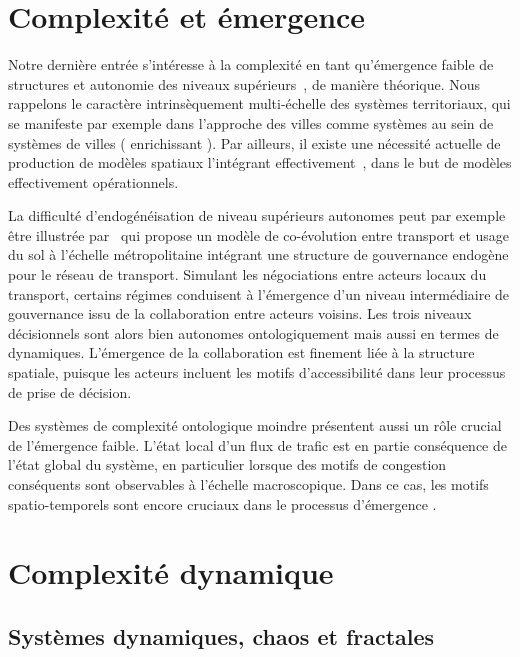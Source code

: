 \documentclass[11pt]{article}
\begin{document}
\section{Complexité et émergence}



Notre dernière entrée s'intéresse à la complexité en tant qu'émergence faible de structures et autonomie des niveaux supérieurs~\citep{bedau2002downward}, de manière théorique. Nous rappelons le caractère intrinsèquement multi-échelle des systèmes territoriaux, qui se manifeste par exemple dans l'approche des villes comme systèmes au sein de systèmes de villes (\cite{pumain1997pour} enrichissant \cite{berry1964cities}). Par ailleurs, il existe une nécessité actuelle de production de modèles spatiaux l'intégrant effectivement~\citep{rozenblat2018conclusion}, dans le but de modèles effectivement opérationnels.

La difficulté d'endogénéisation de niveau supérieurs autonomes peut par exemple être illustrée par~\cite{lenechet:halshs-01272236} qui propose un modèle de co-évolution entre transport et usage du sol à l'échelle métropolitaine intégrant une structure de gouvernance endogène pour le réseau de transport. Simulant les négociations entre acteurs locaux du transport, certains régimes conduisent à l'émergence d'un niveau intermédiaire de gouvernance issu de la collaboration entre acteurs voisins. Les trois niveaux décisionnels sont alors bien autonomes ontologiquement mais aussi en termes de dynamiques. L'émergence de la collaboration est finement liée à la structure spatiale, puisque les acteurs incluent les motifs d'accessibilité dans leur processus de prise de décision.

Des systèmes de complexité ontologique moindre présentent aussi un rôle crucial de l'émergence faible. L'état local d'un flux de trafic est en partie conséquence de l'état global du système, en particulier lorsque des motifs de congestion conséquents sont observables à l'échelle macroscopique. Dans ce cas, les motifs spatio-temporels sont encore cruciaux dans le processus d'émergence \citep{treiber2010three}.






\section{Complexité dynamique}


\subsection{Systèmes dynamiques, chaos et fractales}
\end{document}
